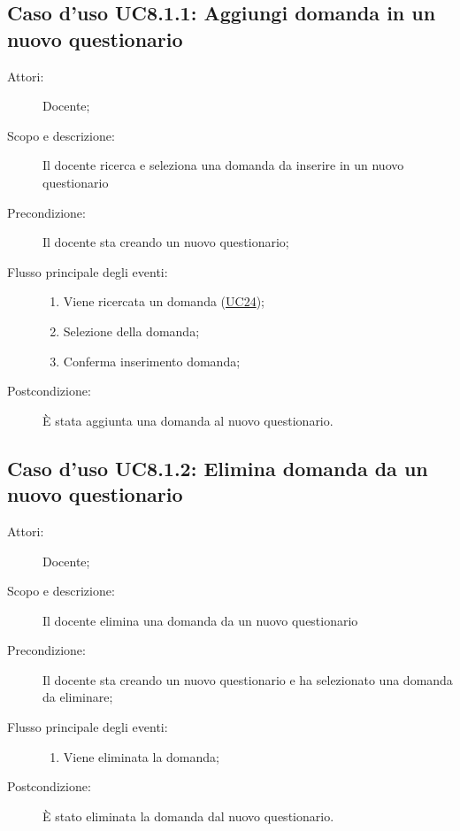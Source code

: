 \subsection{Caso d'uso UC8.1.1: Aggiungi domanda in un nuovo questionario }\begin{description}
\item[Attori:] Docente;
\item[Scopo e descrizione:] Il docente ricerca e seleziona una domanda da inserire in un nuovo questionario
      \item[Precondizione:] Il docente sta creando un nuovo questionario;

        \item[Flusso principale degli eventi:] \begin{enumerate}
          \item Viene ricercata un domanda (\hyperlink{UC24}{UC24});
          \item Selezione della domanda;
          \item Conferma inserimento domanda;

      \end{enumerate}
    \item[Postcondizione:] È stata aggiunta una domanda al nuovo questionario.
  \end{description}
\hypertarget{UC8.1.2}{}
\subsection{Caso d'uso UC8.1.2: Elimina domanda da un nuovo questionario}\begin{description}
\item[Attori:] Docente;
\item[Scopo e descrizione:] Il docente elimina una domanda da un nuovo questionario
      \item[Precondizione:] Il docente sta creando un nuovo questionario e ha selezionato una domanda da eliminare;

        \item[Flusso principale degli eventi:] \begin{enumerate}
          \item Viene eliminata la domanda;

      \end{enumerate}
    \item[Postcondizione:] È stato eliminata la domanda dal nuovo questionario.
  \end{description}
\hypertarget{UC8.1.3}{}
